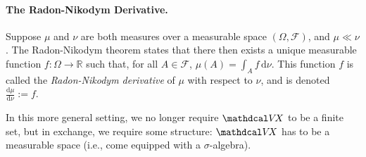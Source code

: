\paragraph{The Radon-Nikodym Derivative.}
Suppose $\mu$ and $\nu$ are both measures over a measurable space $(\Omega,\mathcal F)$, and $\mu \ll \nu$. 
The Radon-Nikodym theorem states that there then exists a unique 
    measurable function $f : \Omega \to \mathbb R$
such that, for all $A \in \mathcal F$,
$
    \mu(A) = \int_{A} f \,\mathrm d \nu.
$
This function $f$ is called the \emph{Radon-Nikodym derivative} of $\mu$ with respect to $\nu$, and is denoted $\frac{\mathrm d\mu}{\mathrm d\nu} := f$.


In this more general setting, we no longer require $\V\!X$ to be a finite set, but in exchange, we require some structure: $\V\!X$ has to be a measurable space (i.e., come equipped with a $\sigma$-algebra).
%
%


